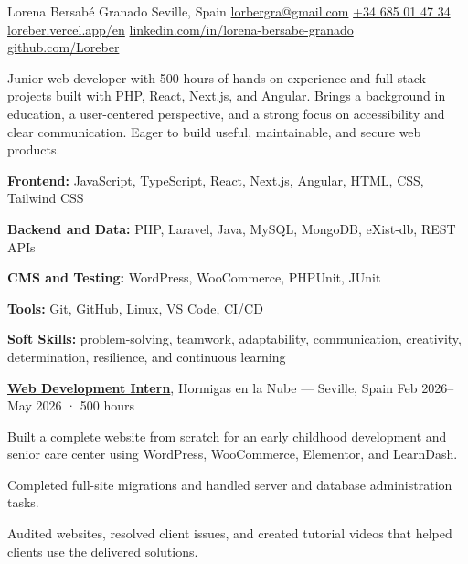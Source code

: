 \documentclass[10pt]{article}
\begin{document}
\cvheader
  {Lorena Bersabé Granado}
  {Seville, Spain \quad\AND\quad
   \href{mailto:lorbergra@gmail.com}{lorbergra@gmail.com} \quad\AND\quad
   \href{tel:+34685014734}{+34 685 01 47 34} \quad\AND\quad
   \href{https://loreber.vercel.app/en}{loreber.vercel.app/en}}
  {\href{https://www.linkedin.com/in/lorena-bersabe-granado}{linkedin.com/in/lorena-bersabe-granado}
   \quad\AND\quad
   \href{https://github.com/Loreber}{github.com/Loreber}}

\vspace{-0.3cm}

Junior web developer with 500 hours of hands-on experience and full-stack projects built with PHP, React, Next.js, and Angular. Brings a background in education, a user-centered perspective, and a strong focus on accessibility and clear communication. Eager to build useful, maintainable, and secure web products.

\begin{skilllist}
  \item \textbf{Frontend:} JavaScript, TypeScript, React, Next.js, Angular, HTML, CSS, Tailwind CSS
  \item \textbf{Backend and Data:} PHP, Laravel, Java, MySQL, MongoDB, eXist-db, REST APIs
  \item \textbf{CMS and Testing:} WordPress, WooCommerce, PHPUnit, JUnit
  \item \textbf{Tools:} Git, GitHub, Linux, VS Code, CI/CD
  \item \textbf{Soft Skills:} problem-solving, teamwork, adaptability, communication, creativity, determination, resilience, and continuous learning
\end{skilllist}

\textbf{\underline{Web Development Intern}}, Hormigas en la Nube --- Seville, Spain
\hfill Feb 2026--May 2026 · 500 hours

\entryspace
\begin{highlights}
  \item Built a complete website from scratch for an early childhood development and senior care center using WordPress, WooCommerce, Elementor, and LearnDash.
  \item Completed full-site migrations and handled server and database administration tasks.
  \item Audited websites, resolved client issues, and created tutorial videos that helped clients use the delivered solutions.
\end{highlights}
\end{document}
